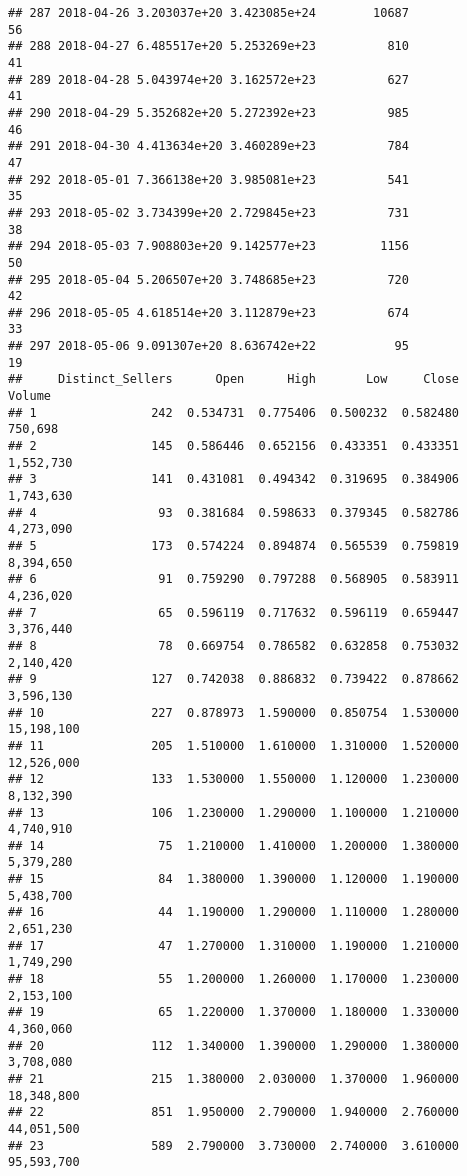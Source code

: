 \documentclass[]{article}
\begin{document}
\begin{verbatim}
## 287 2018-04-26 3.203037e+20 3.423085e+24        10687              56
## 288 2018-04-27 6.485517e+20 5.253269e+23          810              41
## 289 2018-04-28 5.043974e+20 3.162572e+23          627              41
## 290 2018-04-29 5.352682e+20 5.272392e+23          985              46
## 291 2018-04-30 4.413634e+20 3.460289e+23          784              47
## 292 2018-05-01 7.366138e+20 3.985081e+23          541              35
## 293 2018-05-02 3.734399e+20 2.729845e+23          731              38
## 294 2018-05-03 7.908803e+20 9.142577e+23         1156              50
## 295 2018-05-04 5.206507e+20 3.748685e+23          720              42
## 296 2018-05-05 4.618514e+20 3.112879e+23          674              33
## 297 2018-05-06 9.091307e+20 8.636742e+22           95              19
##     Distinct_Sellers      Open      High       Low     Close      Volume
## 1                242  0.534731  0.775406  0.500232  0.582480     750,698
## 2                145  0.586446  0.652156  0.433351  0.433351   1,552,730
## 3                141  0.431081  0.494342  0.319695  0.384906   1,743,630
## 4                 93  0.381684  0.598633  0.379345  0.582786   4,273,090
## 5                173  0.574224  0.894874  0.565539  0.759819   8,394,650
## 6                 91  0.759290  0.797288  0.568905  0.583911   4,236,020
## 7                 65  0.596119  0.717632  0.596119  0.659447   3,376,440
## 8                 78  0.669754  0.786582  0.632858  0.753032   2,140,420
## 9                127  0.742038  0.886832  0.739422  0.878662   3,596,130
## 10               227  0.878973  1.590000  0.850754  1.530000  15,198,100
## 11               205  1.510000  1.610000  1.310000  1.520000  12,526,000
## 12               133  1.530000  1.550000  1.120000  1.230000   8,132,390
## 13               106  1.230000  1.290000  1.100000  1.210000   4,740,910
## 14                75  1.210000  1.410000  1.200000  1.380000   5,379,280
## 15                84  1.380000  1.390000  1.120000  1.190000   5,438,700
## 16                44  1.190000  1.290000  1.110000  1.280000   2,651,230
## 17                47  1.270000  1.310000  1.190000  1.210000   1,749,290
## 18                55  1.200000  1.260000  1.170000  1.230000   2,153,100
## 19                65  1.220000  1.370000  1.180000  1.330000   4,360,060
## 20               112  1.340000  1.390000  1.290000  1.380000   3,708,080
## 21               215  1.380000  2.030000  1.370000  1.960000  18,348,800
## 22               851  1.950000  2.790000  1.940000  2.760000  44,051,500
## 23               589  2.790000  3.730000  2.740000  3.610000  95,593,700

\end{verbatim}
\end{document}
